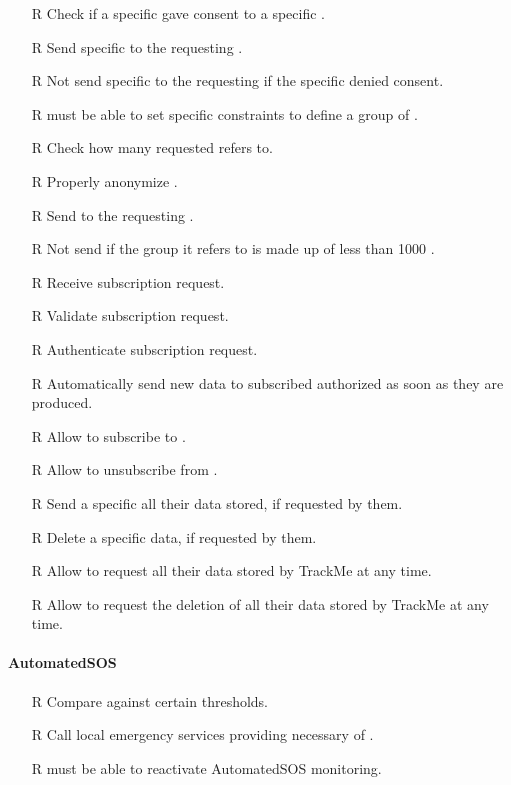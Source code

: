 \documentclass[../../rasd.tex]{subfiles}
\begin{document}
\begin{itemize}
            \item[R\subs{18}]Check if a specific  gave consent to a specific .
            \item[R\subs{19}]Send specific to the requesting .
            \item[R\subs{20}]Not send specific to the requesting  if the specific  denied consent.
            \item[R\subs{21}] must be able to set specific constraints to define a group of .
            \item[R\subs{22}]Check how many  requested  refers to.
            \item[R\subs{23}]Properly anonymize .
            \item[R\subs{24}]Send  to the requesting .
            \item[R\subs{25}]Not send  if the group it refers to is made up of less than 1000 .
            \item[R\subs{26}]Receive  subscription request.
            \item[R\subs{27}]Validate  subscription request.
            \item[R\subs{28}]Authenticate  subscription request.
            \item[R\subs{29}]Automatically send new data to subscribed authorized  as soon as they are produced.
            \item[R\subs{30}]Allow  to subscribe to .
            \item[R\subs{31}]Allow  to unsubscribe from .
            \item[R\subs{32}]Send a specific  all their data stored, if requested by them.
            \item[R\subs{33}]Delete a  specific data, if requested by them.
            \item[R\subs{34}]Allow  to request all their data stored by TrackMe at any time.
            \item[R\subs{35}]Allow  to request the deletion of all their data stored by TrackMe at any time.
        \end{itemize}

        \paragraph{AutomatedSOS}
        \begin{itemize}
            \item[R\subs{36}]Compare  against certain thresholds.
            \item[R\subs{37}]Call local emergency services providing necessary  of .
            \item[R\subs{38}] must be able to reactivate AutomatedSOS monitoring.
        \end{itemize}
\end{document}
